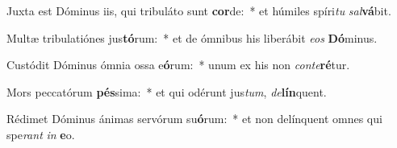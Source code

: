 \item Juxta est Dóminus iis, qui tribuláto sunt \textbf{cor}de:~* et húmiles spíri\textit{tu} \textit{sal}\textbf{vá}bit.
\item Multæ tribulatiónes jus\textbf{tó}rum:~* et de ómnibus his liberábit \textit{e}\textit{os} \textbf{Dó}minus.
\item Custódit Dóminus ómnia ossa e\textbf{ó}rum:~* unum ex his non \textit{con}\textit{te}\textbf{ré}tur.
\item Mors peccatórum \textbf{pés}sima:~* et qui odérunt jus\textit{tum}, \textit{de}\textbf{lín}quent.
\item Rédimet Dóminus ánimas servórum su\textbf{ó}rum:~* et non delínquent omnes qui spe\textit{rant} \textit{in} \textbf{e}o.
